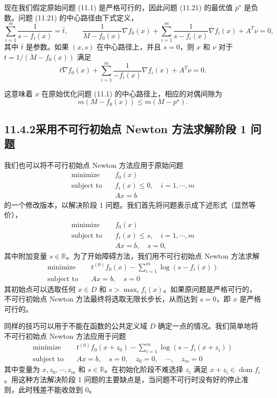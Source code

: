 \documentclass[UTF8, 12pt, fontset=fandol, oneside]{ctexart}
\begin{document}
现在我们假定原始问题 (11.1) 是严格可行的，因此问题 (11.21) 的最优值 $\bar{p}^\star$ 是负数。问题 (11.21) 的中心路径由下式定义，
\[
\sum_{i=1}^m\frac{1}{s-f_i(x)}=\bar{t},\qquad
\frac{1}{M-f_0(x)}\nabla f_0(x)+\sum_{i=1}^m\frac{1}{s-f_i(x)}\nabla f_i(x)+A^T\nu=0,
\]
其中 $\bar{t}$ 是参数。如果 $(x,s)$ 在中心路径上，并且 $s=0$，则 $x$ 和 $\nu$ 对于 $t=1/(M-f_0(x))$ 满足
\[
t\nabla f_0(x)+\sum_{i=1}^m\frac{1}{-f_i(x)}\nabla f_i(x)+A^T\nu=0.
\]

这意味着 $x$ 在原始优化问题 (11.1) 的中心路径上，相应的对偶间隙为
\begin{equation}
m(M-f_0(x))\leq m(M-p^\star).
\tag{11.22}
\end{equation}

\subsection*{11.4.2\quad 采用不可行初始点 Newton 方法求解阶段 1 问题}

我们也可以将不可行初始点 Newton 方法应用于原始问题
\[
\begin{aligned}
\text{minimize}\quad & f_0(x)\\
\text{subject to}\quad & f_i(x)\leq 0,\quad i=1,\cdots,m\\
& Ax=b
\end{aligned}
\]
的一个修改版本，以解决阶段 1 问题。我们首先将问题表示成下述形式（显然等价），
\[
\begin{aligned}
\text{minimize}\quad & f_0(x)\\
\text{subject to}\quad & f_i(x)\leq s,\quad i=1,\cdots,m\\
& Ax=b,\quad s=0,
\end{aligned}
\]
其中附加变量 $s\in\mathbb{R}$。为了开始障碍方法，我们用不可行初始点 Newton 方法求解
\[
\begin{aligned}
\text{minimize}\quad & t^{(0)}f_0(x)-\sum_{i=1}^m\log(s-f_i(x))\\
\text{subject to}\quad & Ax=b,\quad s=0
\end{aligned}
\]
其初始点可以选取任何 $x\in D$ 和 $s>\max_i f_i(x)$。如果原问题是严格可行的，不可行初始点 Newton 方法最终将选取无限长步长，从而达到 $s=0$，即 $x$ 是严格可行的。

同样的技巧可以用于不能在函数的公共定义域 $D$ 确定一点的情况。我们简单地将不可行初始点 Newton 方法应用于问题
\[
\begin{aligned}
\text{minimize}\quad & t^{(0)}f_0(x+z_0)-\sum_{i=1}^m\log(s-f_i(x+z_i))\\
\text{subject to}\quad & Ax=b,\quad s=0,\quad z_0=0,\quad \cdots,\quad z_m=0
\end{aligned}
\]
其中变量为 $x,z_0,\cdots,z_m$ 和 $s\in\mathbb{R}$。在初始化阶段不难选择 $z_i$ 满足 $x+z_i\in\operatorname{dom} f_i$。用这种方法解决阶段 1 问题的主要缺点是，当问题不可行时没有好的停止准则，此时残差不能收敛到 0。
\end{document}
